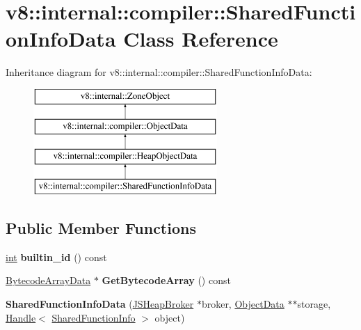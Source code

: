 \hypertarget{classv8_1_1internal_1_1compiler_1_1SharedFunctionInfoData}{}\section{v8\+:\+:internal\+:\+:compiler\+:\+:Shared\+Function\+Info\+Data Class Reference}
\label{classv8_1_1internal_1_1compiler_1_1SharedFunctionInfoData}
Inheritance diagram for v8\+:\+:internal\+:\+:compiler\+:\+:Shared\+Function\+Info\+Data\+:\begin{figure}[H]
\begin{center}
\leavevmode
\includegraphics[height=4.000000cm]{classv8_1_1internal_1_1compiler_1_1SharedFunctionInfoData}
\end{center}
\end{figure}
\subsection*{Public Member Functions}
\begin{DoxyCompactItemize}
\item 
\mbox{\label{classv8_1_1internal_1_1compiler_1_1SharedFunctionInfoData_a782fb1f981ab81fd1f367114fd5514da}} 
\mbox{\hyperlink{classint}{int}} {\bfseries builtin\+\_\+id} () const
\item 
\mbox{\label{classv8_1_1internal_1_1compiler_1_1SharedFunctionInfoData_a7f6331a01820f1c22fc7c8e29930cc5d}} 
\mbox{\hyperlink{classv8_1_1internal_1_1compiler_1_1BytecodeArrayData}{Bytecode\+Array\+Data}} $\ast$ {\bfseries Get\+Bytecode\+Array} () const
\item 
\mbox{\label{classv8_1_1internal_1_1compiler_1_1SharedFunctionInfoData_aeecfbffd47dfc57565388899d440f1f8}} 
{\bfseries Shared\+Function\+Info\+Data} (\mbox{\hyperlink{classv8_1_1internal_1_1compiler_1_1JSHeapBroker}{J\+S\+Heap\+Broker}} $\ast$broker, \mbox{\hyperlink{classv8_1_1internal_1_1compiler_1_1ObjectData}{Object\+Data}} $\ast$$\ast$storage, \mbox{\hyperlink{classv8_1_1internal_1_1Handle}{Handle}}$<$ \mbox{\hyperlink{classv8_1_1internal_1_1SharedFunctionInfo}{Shared\+Function\+Info}} $>$ object)
\end{DoxyCompactItemize}
